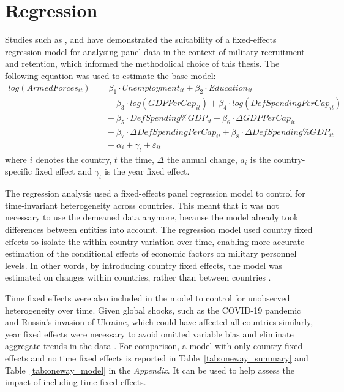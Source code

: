 \section{Regression}

Studies such as \textcite{asch_cash_2010}, \textcite{backstrom_are_2019} and 
\textcite{balcaen_unemployment_2025} have demonstrated the suitability of a fixed-effects 
regression model for analysing panel data in the context of military recruitment and retention, 
which informed the methodolical choice of this thesis.
The following equation was used to estimate the base model:
\begin{align*}
log(ArmedForces_{it}) &= \beta_1 \cdot Unemployment_{it} 
+ \beta_2 \cdot Education_{it} \\
&\quad + \beta_3 \cdot log(GDPPerCap_{it}) 
+ \beta_4 \cdot log(DefSpendingPerCap_{it}) \\
&\quad + \beta_5 \cdot DefSpending\%GDP_{it} 
+ \beta_6 \cdot \Delta GDPPerCap_{it} \\
&\quad + \beta_7 \cdot \Delta DefSpendingPerCap_{it} 
+ \beta_8 \cdot \Delta DefSpending\%GDP_{it} \\
&\quad + \alpha_i + \gamma_t + \varepsilon_{it}
\end{align*}
where $i$ denotes the country, $t$ the time, $\Delta$ the annual change,
$a_i$ is the country-specific fixed effect and $\gamma_t$ is the year fixed effect.

The regression analysis used a fixed-effects panel regression model to control for time-invariant 
heterogeneity across countries. This meant that it was not 
necessary to use the demeaned data anymore, 
because the model already took differences between entities into account.
The regression model used country fixed effects to isolate the within-country variation over time, 
enabling more accurate 
estimation of the conditional effects of economic factors on military personnel levels.
In other words, by introducing country fixed effects, the model was estimated on changes within 
countries, rather than between countries \parencite{backstrom_are_2019}.

Time fixed effects were also included in the model to control for unobserved heterogeneity
over time. Given global shocks, such as the COVID-19 pandemic and Russia's invasion of 
Ukraine, which could have affected all countries similarly, year fixed effects were 
necessary to avoid omitted variable bias and eliminate aggregate trends in the data \parencite{backstrom_are_2019}.
For comparison, a model with only country fixed effects and no time fixed effects
is reported in Table~\ref{tab:oneway_summary} and Table~\ref{tab:oneway_model} in 
the \textit{Appendix}.
It can be used to help assess the impact of including time fixed effects.

